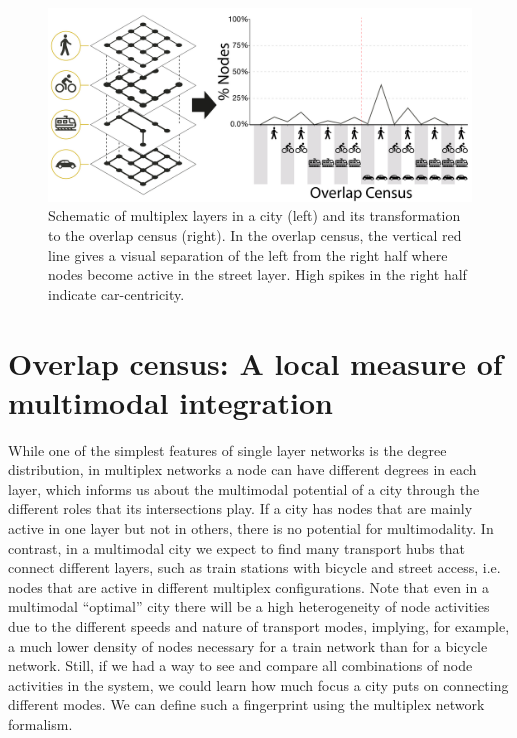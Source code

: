 \begin{figure}[ht!]
	\centering
	\includegraphics[width=\textwidth]{images/multiplex/SchemaOverlapCensus.png}
	\caption[Schematic overlap census]{
		Schematic of multiplex layers in a city (left) and its transformation to the overlap census (right). In the overlap census, the vertical red line gives a visual separation of the left from the right half where nodes become active in the street layer. High spikes in the right half indicate car-centricity.}
	\label{fig:SchemaOverlapCensus}
\end{figure}

\section{Overlap census: A local measure of multimodal integration}
While one of the simplest features of single layer networks is the degree distribution, in multiplex networks a node can have different degrees in each layer, which informs us about the multimodal potential of a city through the different roles that its intersections play. If a city has nodes that are mainly active in one layer but not in others, there is no potential for multimodality. In contrast, in a multimodal city we expect to find many transport hubs that connect different layers, such as train stations with bicycle and street access, i.e. nodes that are active in different multiplex configurations. Note that even in a multimodal ``optimal'' city there will be a high heterogeneity of node activities due to the different speeds and nature of transport modes, implying, for example, a much lower density of nodes necessary for a train network than for a bicycle network. Still, if we had a way to see and compare all combinations of node activities in the system, we could learn how much focus a city puts on connecting different modes. We can define such a fingerprint using the multiplex network formalism.

